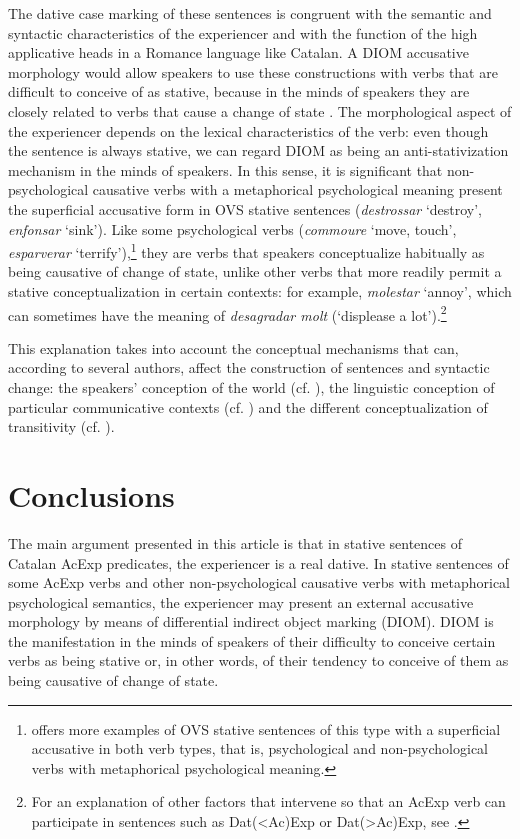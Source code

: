 \documentclass[output=paper,colorlinks,citecolor=brown,modfonts,nonflat]{langsci/langscibook}
\begin{document}
\largerpage
The dative case marking of these sentences is congruent with the semantic and syntactic characteristics of the experiencer and with the function of the high applicative heads in a Romance language like Catalan. A DIOM accusative morphology would allow speakers to use these constructions with verbs that are difficult to conceive of as stative, because in the minds of speakers they are closely related to verbs that cause a change of state . The morphological aspect of the experiencer depends on the lexical characteristics of the verb: even though the sentence is always stative, we can regard DIOM as being an anti-stativization mechanism in the minds of speakers. In this sense, it is significant that non-psychological causative verbs with a metaphorical psychological meaning present the superficial accusative form in OVS stative sentences (\textit{destrossar} ‘destroy’, \textit{enfonsar} ‘sink’). Like some psychological verbs (\textit{commoure} ‘move, touch’, \textit{esparverar} ‘terrify’),\footnote{\citet[14, 29--30]{Ginebra2003} offers more examples of OVS stative sentences of this type with a superficial accusative in both verb types, that is, psychological and non-psychological verbs with metaphorical psychological meaning.} they are verbs that speakers conceptualize habitually as being causative of change of state, unlike other verbs that more readily permit a stative conceptualization in certain contexts: for example, \textit{molestar} ‘annoy’, which can sometimes have the meaning of \textit{desagradar molt} (‘displease a lot').\footnote{For an explanation of other factors that intervene so that an AcExp verb can participate in sentences such as Dat(<Ac)Exp or Dat(>Ac)Exp, see \citet[Section 5]{Royo2017}.}

This explanation takes into account the conceptual mechanisms that can, according to several authors, affect the construction of sentences and syntactic change: the speakers’ conception of the world (cf. \citealt{Ramos2002}), the linguistic conception of particular communicative contexts (cf. \citealt{Rossello2008}) and the different conceptualization of transitivity (cf. \citealt{Ynglès2011, Pineda2012}).

\section{Conclusions}\label{sec:royo:6}
\largerpage
The main argument presented in this article is that in stative sentences of Catalan AcExp predicates, the experiencer is a real dative. In stative sentences of some AcExp verbs and other non-psychological causative verbs with metaphorical psychological semantics, the experiencer may present an external accusative morphology by means of differential indirect object marking (DIOM). DIOM is the manifestation in the minds of speakers of their difficulty to conceive certain verbs as being stative or, in other words, of their tendency to conceive of them as being causative of change of state.
\end{document}
